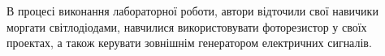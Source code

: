 
В процесі виконання лабораторної роботи, автори відточили свої навичики моргати світлодіодами, навчилися використовувати фоторезистор у своїх проектах, а також керувати зовнішнім генератором електричних сигналів.